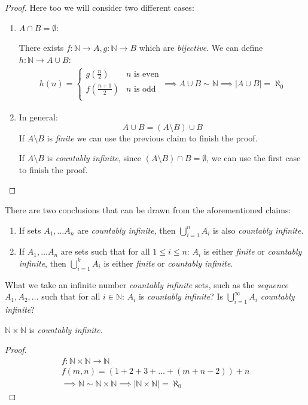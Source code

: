 \documentclass[00_complete]{subfiles}
\begin{document}
\begin{proof}
    Here too we will consider two different cases:
    \begin{enumerate}
        \item $A \cap B = \emptyset$:

        There exists $f:\mathbb{N}\to A,g:\mathbb{N}\to B$ which are
        \emph{bijective}. We can define $h: \mathbb{N} \to A \cup B$:
        \begin{gather*}
        h(n)=\begin{cases}
            g(\frac{n}{2}) & \text{$n$ is even} \\
            f(\frac{n+1}{2}) & \text{$n$ is odd} \\
        \end{cases} \implies A \cup B \sim \mathbb{N} \implies |A\cup B| =
        \aleph_0
        \end{gather*}
        \item In general:
        $$A \cup B = (A \setminus B) \cup B$$
        If $A \setminus B$ is \emph{finite} we can use the previous claim to
        finish the proof.

        If $A \setminus B$ is \emph{countably infinite}, since $(A \setminus B)
        \cap B = \emptyset$, we can use the first case to finish the proof.
    \end{enumerate}
\end{proof}
\begin{conclusion}
    There are two conclusions that can be drawn from the aforementioned claims:
    \begin{enumerate}
       \item If sets $A_1,\dots A_n$ are \emph{countably infinite}, then
           $\bigcup_{i=1}^nA_i$ is also \emph{countably infinite}.
       \item If $A_1,\dots A_n$ are sets such that for all $1 \leq i \leq n$:
           $A_i$ is either \emph{finite} or \emph{countably infinite}, then
           $\bigcup_{i=1}^kA_i$ is either \emph{finite} or \emph{countably
           infinite}.
    \end{enumerate}
\end{conclusion}
    What we take an infinite number \emph{countably infinite} sets, such as the
    \emph{sequence} $A_1,A_2,\dots$ such that for all $i \in \mathbb{N}$: $A_i$
    is \emph{countably infinite}? Is $\bigcup_{i=1}^{\infty}A_i$
    \emph{countably infinite}?
\begin{claim}
    $\mathbb{N}\times\mathbb{N}$ is \emph{countably infinite}.
\end{claim}
\begin{proof}
    \begin{gather*}
        f:\mathbb{N}\times\mathbb{N}\to\mathbb{N} \\
        f(m,n)=(1+2+3+\dots+(m+n-2)) + n \\
        \implies \mathbb{N} \sim \mathbb{N}\times\mathbb{N} \implies
        |\mathbb{N}\times\mathbb{N}|=\aleph_0
    \end{gather*}
\end{proof}
\end{document}
